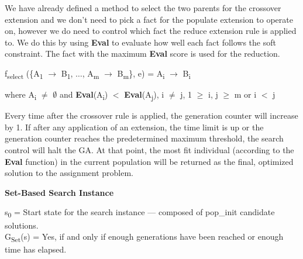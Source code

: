 \documentclass[11pt, oneside]{article}   	%
\begin{document}
\begin{comment}
\noindent Next, in order to produce $F$, the control will execute the following algorithm:

\noindent produce($F$) \{
\begin{algorithmic}[\textfloatsep = 0pt]
    \STATE $i$ = 0
    \WHILE {$i <$ pop_init}
    	\IF {\textit{partassign} $\in$ input}
		\STATE individual = Or-tree-based Search execution with $s_0$ = \textit{partassign}
	\ELSE
		\STATE individual = Or-tree-based Search execution with $s_0$ as originally defined in our Or-tree-based Search Instance
	\ENDIF
	\STATE $F$ = $F$ + individual
	\STATE $i$ ++ 1
    \ENDWHILE \\ \}
\end{algorithmic}
\end{comment}

\noindent We have already defined a method to select the two parents for the crossover extension and we don't need to pick a fact for the populate extension to operate on, however we do need to control which fact the reduce extension rule is applied to. We do this by using \textbf{Eval} to evaluate how well each fact follows the soft constraint. The fact with the maximum \textbf{Eval} score is used for the reduction.

\noindent f\textsubscript{select} (\{A\textsubscript{1} $\rightarrow$ B\textsubscript{1}, $\dots$, A\textsubscript{m} $\rightarrow$ B\textsubscript{m}\}, e) = A\textsubscript{i} $\rightarrow$ B\textsubscript{i}

\noindent where A\textsubscript{i} $\neq$ $\emptyset$ and \textbf{Eval}(A\textsubscript{i}) $<$ \textbf{Eval}(A\textsubscript{j}), i $\neq$ j, 1 $\geq$ i, j $\geq$ m or i $<$ j

\noindent Every time after the crossover rule is applied, the generation counter will increase by 1. If after any application of an extension, the time limit is up or the generation counter reaches the predetermined maximum threshold, the search control will halt the GA. At that point, the most fit individual (according to the \textbf{Eval} function) in the current population will be returned as the final, optimized solution to the assignment problem.

\noindent \textbf{Set-Based Search Instance}

\noindent s\textsubscript{0} = Start state for the search instance --- composed of pop_init candidate solutions.\\
G\textsubscript{Set}(s) = Yes, if and only if enough generations have been reached or enough time has elapsed.\\\\
\end{document}
